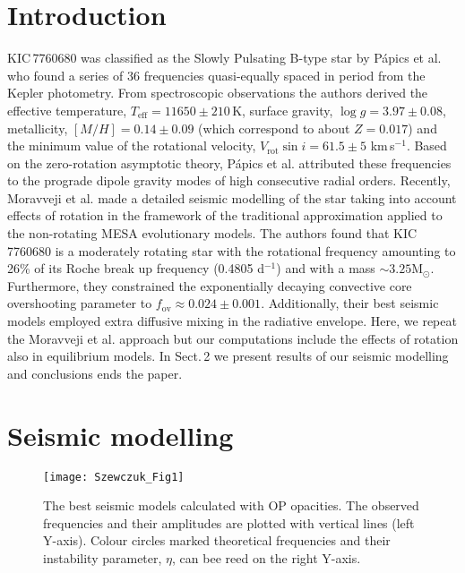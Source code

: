 \documentclass[epj,twocolumn]{webofc}
\begin{document}
\section{Introduction}
\label{intro}
KIC\,7760680 was classified as the Slowly Pulsating B-type star by P{\'a}pics et al. \cite{Papics2015}
who found a series of 36 frequencies quasi-equally spaced in period from the Kepler photometry.
From spectroscopic observations the authors derived the effective temperature, $T_\mathrm{eff}=11650\pm 210$\,K,
surface gravity, $\log g=3.97\pm 0.08$, metallicity, $[M/H]=0.14\pm0.09$ (which correspond to about $Z=0.017$)
and the minimum value of the rotational velocity, $V_\mathrm{rot}\sin i=61.5\pm 5$ km\,s$^{-1}$.
Based on the zero-rotation asymptotic theory, P{\'a}pics et al. \cite{Papics2015} attributed
these frequencies to the prograde dipole gravity modes of high consecutive radial orders.
Recently, Moravveji et al. \citep{Moravveji2016} made a detailed seismic modelling of the star taking
into account effects of rotation in the framework of the traditional approximation
\cite[e.\,g.,][]{Lee_Saio1997,Townsend2003b,Townsend2003a,Townsend2005,2005MNRAS.364..573T, WD_JDD_AP2007,JDD_WD_AP2007}
applied to the non-rotating MESA \cite{Paxton2011,Paxton2013,Paxton2015}
evolutionary models. The authors found
that KIC\,7760680 is a moderately rotating star with the rotational frequency amounting to 26\% of its Roche break up frequency (0.4805 d$^{-1}$)
and with a mass $\sim 3.25 \mathrm M_\odot$. Furthermore, they constrained
the exponentially decaying convective core overshooting
parameter to $f_\mathrm{ov} \approx 0.024\pm 0.001$. Additionally, their best seismic
models employed extra diffusive mixing in the radiative envelope.
Here, we repeat the Moravveji et al. \citep{Moravveji2016} approach but our computations include the effects of rotation
also in equilibrium models. In Sect.\,2 we present results of our seismic modelling and conclusions ends the paper.

\section{Seismic modelling}

\begin{figure*}
\centering
\texttt{[image: Szewczuk\_Fig1]}
\caption{The best seismic models calculated with OP opacities. The observed frequencies and their amplitudes
are plotted with vertical lines (left Y-axis).
Colour circles marked theoretical frequencies and their instability parameter, $\eta$, can bee reed
on the right Y-axis.}
\label{fig-1}       %
\end{figure*}
\end{document}
